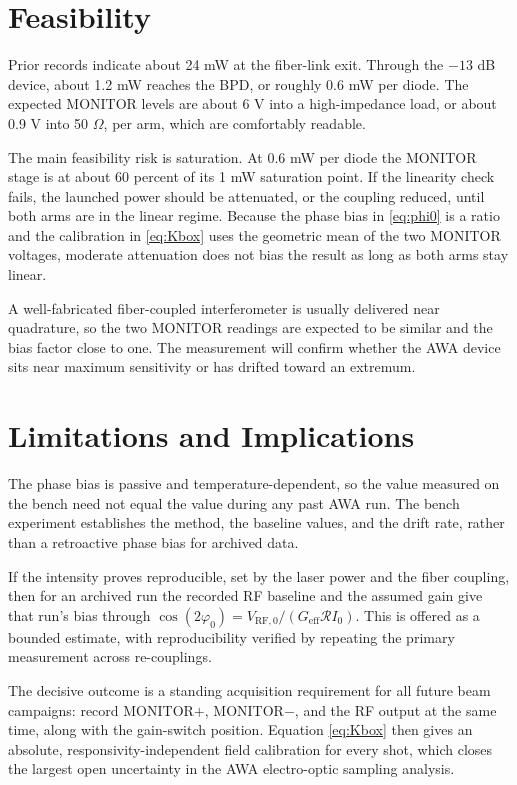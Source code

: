 \documentclass[11pt]{article}
\newcommand{\Iz}{I_{0}}
\newcommand{\phz}{\varphi_{0}}
\newcommand{\Resp}{\mathcal{R}}
\begin{document}
\section{Feasibility}

Prior records indicate about 24 mW at the fiber-link exit. Through the $-13$ dB device,
about 1.2 mW reaches the BPD, or roughly 0.6 mW per diode. The expected MONITOR levels
are about 6 V into a high-impedance load, or about 0.9 V into 50 $\Omega$, per arm, which
are comfortably readable.

The main feasibility risk is saturation. At 0.6 mW per diode the MONITOR stage is at
about 60 percent of its 1 mW saturation point. If the linearity check fails, the launched
power should be attenuated, or the coupling reduced, until both arms are in the linear
regime. Because the phase bias in \eqref{eq:phi0} is a ratio and the calibration in
\eqref{eq:Kbox} uses the geometric mean of the two MONITOR voltages, moderate
attenuation does not bias the result as long as both arms stay linear.

A well-fabricated fiber-coupled interferometer is usually delivered near quadrature, so
the two MONITOR readings are expected to be similar and the bias factor close to one. The
measurement will confirm whether the AWA device sits near maximum sensitivity or has
drifted toward an extremum.

\section{Limitations and Implications}

The phase bias is passive and temperature-dependent, so the value measured on the bench
need not equal the value during any past AWA run. The bench experiment establishes the
method, the baseline values, and the drift rate, rather than a retroactive phase bias for
archived data.

If the intensity proves reproducible, set by the laser power and the fiber coupling, then
for an archived run the recorded RF baseline and the assumed gain give that run's bias
through $\cos(2\phz) = V_{\mathrm{RF,0}}/(G_{\mathrm{eff}}\Resp\Iz)$. This is offered as a
bounded estimate, with reproducibility verified by repeating the primary measurement
across re-couplings.

The decisive outcome is a standing acquisition requirement for all future beam
campaigns: record MONITOR$+$, MONITOR$-$, and the RF output at the same time, along with
the gain-switch position. Equation \eqref{eq:Kbox} then gives an absolute,
responsivity-independent field calibration for every shot, which closes the largest open
uncertainty in the AWA electro-optic sampling analysis.
\end{document}
